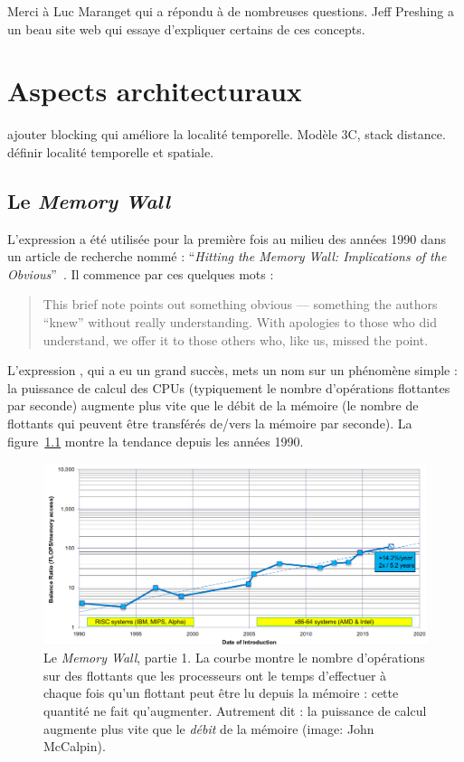 Merci à Luc Maranget qui a répondu à de nombreuses questions. Jeff Preshing a un
beau site web qui essaye d'expliquer certains de ces concepts.

\part{Aspects architecturaux}









ajouter blocking qui améliore la localité temporelle. Modèle 3C, stack distance. définir localité temporelle et spatiale.


\chapter{Le \og \emph{Memory Wall}\fg}
\label{chap:memory}

L'expression \og {}\fg a été utilisée pour la première fois
au milieu des années 1990 dans un article de recherche nommé : ``\emph{Hitting
  the Memory Wall: Implications of the Obvious}''~\cite{wulf1995hitting}. Il
commence par ces quelques mots :
\begin{quote}
  This brief note points out something obvious --- something the authors
  ``knew'' without really understanding. With apologies to those who did
  understand, we offer it to those others who, like us, missed the point.
\end{quote}

L'expression , qui a eu un grand succès, mets un nom sur un
phénomène simple : la puissance de calcul des CPUs (typiquement le nombre
d'opérations flottantes par seconde) augmente plus vite que le débit de la
mémoire (le nombre de flottants qui peuvent être transférés de/vers la mémoire
par seconde). La figure~\ref{fig:memwall_bw} montre la tendance depuis les
années 1990.

\begin{figure}
  \includegraphics[width=\textwidth]{calpin_wall_bw.png}
  \caption{Le \og \emph{Memory Wall}\fg, partie 1. La courbe montre le nombre
    d'opérations sur des flottants que les processeurs ont le temps d'effectuer
    à chaque fois qu'un flottant peut être lu depuis la mémoire : cette quantité
    ne fait qu'augmenter. Autrement dit : la puissance de calcul augmente plus
    vite que le \emph{débit} de la mémoire (image: John
    McCalpin). \label{fig:memwall_bw}}
\end{figure}

